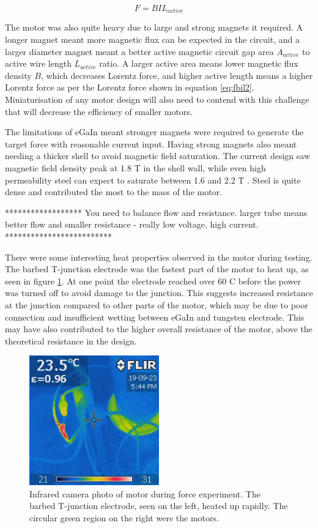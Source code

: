 \documentclass[a4paper,12pt]{article}
\begin{document}
\begin{equation}\label{eq:fbil2}
    F = BIL_{active}
\end{equation}

The motor was also quite heavy due to large and strong magnets it required. A longer magnet meant more magnetic flux can be expected in the circuit, and a larger diameter magnet meant a better active magnetic circuit gap area $A_{active}$ to active wire length $L_{active}$ ratio. A larger active area means lower magnetic flux density $B$, which decreases Lorentz force, and higher active length means a higher Lorentz force as per the Lorentz force shown in equation \ref{eq:fbil2}. Miniaturisation of any motor design will also need to contend with this challenge that will decrease the efficiency of smaller motors.

The limitations of eGaIn meant stronger magnets were required to generate the target force with reasonable current input. Having strong magnets also meant needing a thicker shell to avoid magnetic field saturation. The current design saw magnetic field density peak at 1.8 T in the shell wall, while even high permeability steel can expect to saturate between 1.6 and 2.2 T \cite{laughtonElectricalEngineerReference2002}. Steel is quite dense and contributed the most to the mass of the motor.

****************** You need to balance flow and resistance. larger tube means better flow and smaller resistance - really low voltage, high current. *************************

There were some interesting heat properties observed in the motor during testing. The barbed T-junction electrode was the fastest part of the motor to heat up, as seen in figure \ref{fg:tjunction}. At one point the electrode reached over 60 \degree C before the power was turned off to avoid damage to the junction. This suggests increased resistance at the junction compared to other parts of the motor, which may be due to poor connection and insufficient wetting between eGaIn and tungsten electrode. This may have also contributed to the higher overall resistance of the motor, above the theoretical resistance in the design.

\begin{figure}[h!]
    \centering
    \includegraphics[width=0.5\textwidth]{junctionheat2.jpg}
    \caption{Infrared camera photo of motor during force experiment. The barbed T-junction electrode, seen on the left, heated up rapidly. The circular green region on the right were the motors.}
    \label{fg:tjunction}
\end{figure}
\end{document}

